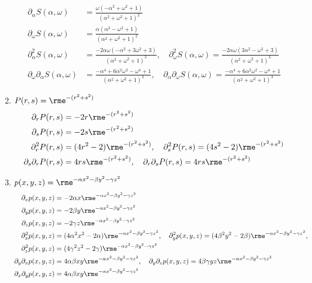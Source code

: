 \documentclass[11pt,answers]{exam}
\begin{document}
\begin{questions}
\begin{solution}
\begin{enumerate}
\begin{align*}
	\partial_\alpha S(\alpha,\omega)&=\frac{\omega(-\alpha^2+\omega^2+1)}{(\alpha^2+\omega^2+1)^2}
	\\
	\partial_\omega S(\alpha,\omega)&=\frac{\alpha(\alpha^2-\omega^2+1)}{(\alpha^2+\omega^2+1)^2}
	\\
	\partial_\alpha^2S(\alpha,\omega)&=\frac{-2\alpha\omega(-\alpha^2+3\omega^2+3)}{(\alpha^2+\omega^2+1)^3}
	,\quad
	\partial_\omega^2S(\alpha,\omega)=\frac{-2\alpha\omega(3\alpha^2-\omega^2+3)}{(\alpha^2+\omega^2+1)^3}
	\\
	\partial_\omega\partial_\alpha S(\alpha,\omega)&=\frac{-\alpha^4+6\alpha^2\omega^2-\omega^4+1}{(\alpha^2+\omega^2+1)^3}
	,\quad
	\partial_\alpha\partial_\omega S(\alpha,\omega)=\frac{-\alpha^4+6\alpha^2\omega^2-\omega^4+1}{(\alpha^2+\omega^2+1)^3}
\end{align*}
\item $P(r,s)=\rme^{-(r^2+s^2)}$
\begin{align*}
	\partial_rP(r,s)&=-2r\rme^{-(r^2+s^2)}
	\\
	\partial_sP(r,s)&=-2s\rme^{-(r^2+s^2)}
	\\
	\partial_r^2P(r,s)&=(4r^2-2)\rme^{-(r^2+s^2)}
	,\quad
	\partial_s^2P(r,s)=(4s^2-2)\rme^{-(r^2+s^2)}
	\\
	\partial_s\partial_rP(r,s)&=4rs\rme^{-(r^2+s^2)}
	,\quad
	\partial_r\partial_sP(r,s)=4rs\rme^{-(r^2+s^2)}
\end{align*}
\item $p(x,y,z)=\rme^{-\alpha x^2-\beta y^2-\gamma z^2}$
\begin{align*}
	\partial_xp(x,y,z)&=-2\alpha x\rme^{-\alpha x^2-\beta y^2-\gamma z^2}
	\\
	\partial_yp(x,y,z)&=-2\beta y\rme^{-\alpha x^2-\beta y^2-\gamma z^2}
	\\
	\partial_zp(x,y,z)&=-2\gamma z\rme^{-\alpha x^2-\beta y^2-\gamma z^2}
	\\
	\partial_x^2p(x,y,z)&=(4\alpha^2x^2-2\alpha)\rme^{-\alpha x^2-\beta y^2-\gamma z^2}, \quad \partial_y^2p(x,y,z)=(4\beta^2y^2-2\beta)\rme^{-\alpha x^2-\beta y^2-\gamma z^2},\\ \partial_z^2p(x,y,z)&=(4\gamma^2z^2-2\gamma)\rme^{-\alpha x^2-\beta y^2-\gamma z^2}
	\\
	\partial_y\partial_xp(x,y,z)&=4\alpha\beta xy\rme^{-\alpha x^2-\beta y^2-\gamma z^2}
	,\quad
	\partial_y\partial_zp(x,y,z)=4\beta\gamma yz\rme^{-\alpha x^2-\beta y^2-\gamma z^2}
	\\
	\partial_x\partial_yp(x,y,z)&=4\alpha\beta xy\rme^{-\alpha x^2-\beta y^2-\gamma z^2}

\end{align*}
\end{enumerate}
\end{solution}
\end{questions}
\end{document}
